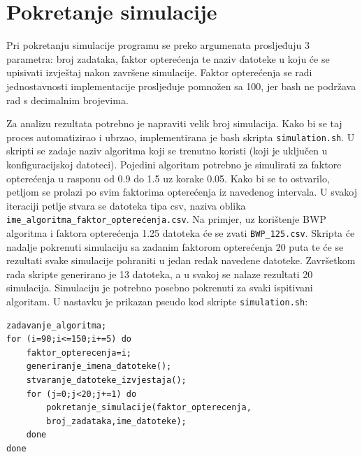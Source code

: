 \documentclass[../zavrsni.tex]{subfiles}
\begin{document}
\section{Pokretanje simulacije}

Pri pokretanju simulacije programu se preko argumenata prosljeđuju 3 parametra: broj zadataka, 
faktor opterećenja te naziv datoteke u koju će se upisivati izvještaj nakon završene simulacije.
Faktor opterećenja se radi jednostavnosti implementacije prosljeđuje pomnožen sa 100, jer bash ne podržava rad s decimalnim brojevima.

Za analizu rezultata potrebno je napraviti velik broj simulacija. Kako bi se taj proces automatizirao i ubrzao, implementirana 
je bash skripta \texttt{simulation.sh}. U skripti se zadaje naziv algoritma koji se trenutno koristi (koji je uključen u 
konfiguracijskoj datoteci). Pojedini algoritam potrebno je simulirati za faktore opterećenja u rasponu od 0.9 do 1.5 uz korake 0.05.
Kako bi se to ostvarilo, petljom se prolazi po svim faktorima opterećenja iz navedenog intervala. U svakoj iteraciji petlje stvara se datoteka tipa
csv, naziva oblika \texttt{{ime\_algoritma}\_{faktor\_opterećenja}.csv}. Na primjer, uz korištenje BWP algoritma i faktora opterećenja 1.25 
datoteka će se zvati \texttt{BWP\_125.csv}. Skripta će nadalje pokrenuti simulaciju sa zadanim faktorom opterećenja 20 puta te će se rezultati 
svake simulacije pohraniti u jedan redak navedene datoteke. Završetkom rada skripte generirano je 13 datoteka, a u svakoj se nalaze rezultati 
20 simulacija. Simulaciju je potrebno posebno pokrenuti za svaki ispitivani algoritam. U nastavku je prikazan pseudo kod skripte \texttt{simulation.sh}: 

\begin{lstlisting}[style=CStyle,caption={Pseudo kod skripte \texttt{simulation.sh}},captionpos=b]
zadavanje_algoritma;
for (i=90;i<=150;i+=5) do
	faktor_opterecenja=i;
	generiranje_imena_datoteke();
	stvaranje_datoteke_izvjestaja();
	for (j=0;j<20;j+=1) do
		pokretanje_simulacije(faktor_opterecenja,
        broj_zadataka,ime_datoteke);
	done
done
\end{lstlisting}
\end{document}
